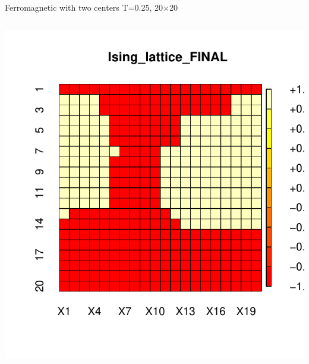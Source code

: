 \documentclass{beamer}
\begin{document}
\begin{frame}{Ferromagnetic with two centers T=0.25,  20$\times$20}
\begin{columns}
\begin{column}{0.5\textwidth}
\begin{center}
     \includegraphics[width=\textwidth]{Pic/J+1_20_10000_T=0.25_2.pdf}
     \end{center}
\end{column}
\end{columns}
\end{frame}
\end{document}
